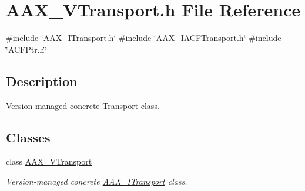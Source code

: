 \hypertarget{a00728}{}\section{A\+A\+X\+\_\+\+V\+Transport.\+h File Reference}
\label{a00728}
{\ttfamily \#include \char`\"{}A\+A\+X\+\_\+\+I\+Transport.\+h\char`\"{}}\newline
{\ttfamily \#include \char`\"{}A\+A\+X\+\_\+\+I\+A\+C\+F\+Transport.\+h\char`\"{}}\newline
{\ttfamily \#include \char`\"{}A\+C\+F\+Ptr.\+h\char`\"{}}\newline


\subsection{Description}
Version-\/managed concrete Transport class. 

\subsection*{Classes}
\begin{DoxyCompactItemize}
\item 
class \mbox{\hyperlink{a01941}{A\+A\+X\+\_\+\+V\+Transport}}
\begin{DoxyCompactList}\small\item\em Version-\/managed concrete \mbox{\hyperlink{a01885}{A\+A\+X\+\_\+\+I\+Transport}} class. \end{DoxyCompactList}\end{DoxyCompactItemize}
